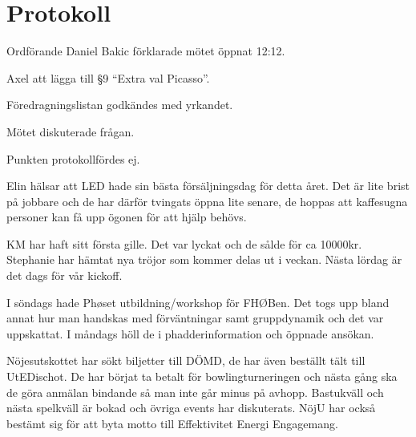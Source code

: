 \documentclass[10pt]{article}
\def\mo{Daniel Bakic}
\begin{document}
\section*{Protokoll}
\begin{paragrafer}
Ordförande {\mo} förklarade mötet öppnat 12:12.

{\valavmo}

{\valavms}

{\valavj}

{\tosg}

{\ingaadj}


Axel \ypa att lägga till \S9 ``Extra val Picasso''.

Föredragningslistan godkändes med yrkandet.

\ingaprot

Mötet diskuterade frågan.


\begin{fyllnadsval} %
\end{fyllnadsval}

\begin{paragrafer}
Punkten protokollfördes ej.


Elin hälsar att LED hade sin bästa försäljningsdag för detta året. Det är lite brist på jobbare och de har därför tvingats öppna lite senare, de hoppas att kaffesugna personer kan få upp ögonen för att hjälp behövs.

KM har haft sitt första gille. Det var lyckat och de sålde för ca 10000kr. Stephanie har hämtat nya tröjor som kommer delas ut i veckan. Nästa lördag är det dags för vår kickoff.

I söndags hade Phøset utbildning/workshop för FHØBen. Det togs upp bland annat hur man handskas med förväntningar samt gruppdynamik och det var uppskattat. I måndags höll de i phadderinformation och öppnade ansökan.

Nöjesutskottet har sökt biljetter till DÖMD, de har även beställt tält till UtEDischot. De har börjat ta betalt för bowlingturneringen och nästa gång ska de göra anmälan bindande så man inte går minus på avhopp. Bastukväll och nästa spelkväll är bokad och övriga events har diskuterats. NöjU har också bestämt sig för att byta motto till Effektivitet Energi Engagemang.


\end{paragrafer}
\end{paragrafer}
\end{document}
